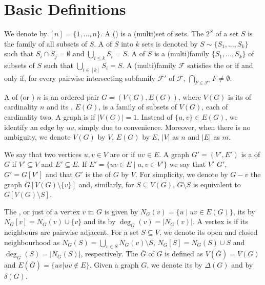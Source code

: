 \section{Basic Definitions}
\label{sec:basic_defs}

We denote by $[n] = \{1, \dots, n\}$.
A () is a (multi)set of sets.
The  $2^S$ of a set $S$ is the family of all subsets of $S$.
A  of $S$ into $k$ sets is denoted by $S \sim \{S_1, \dots, S_k\}$ such that $S_i \cap S_j = \emptyset$ and $\bigcup_{i \leq k} S_i = S$.
A  of $S$ is a (multi)family $\{S_1, \dots, S_k\}$ of subsets of $S$ such that $\bigcup_{i \in [k]} S_i = S$.
A (multi)family $\mathcal{F}$ satisfies the  or  if and only if, for every pairwise intersecting subfamily $\mathcal{F}'$ of $\mathcal{F}$, $\bigcap_{F \in \mathcal{F}'} F \neq \emptyset$.

A  of  (or ) $n$ is an ordered pair $G = (V(G), E(G))$, where $V(G)$ is its  of cardinality $n$ and its , $E(G)$, is a family of subsets of $V(G)$, each of cardinality two. A graph is  if $|V(G)| = 1$.
Instead of $\{u,v\} \in E(G)$, we identify an edge by $uv$, simply due to convenience. Moreover, when there is no ambiguity, we denote $V(G)$ by $V$, $E(G)$ by $E$, $|V|$ as $n$ and $|E|$ as $m$.

We say that two vertices $u,v \in V$ are  or  if $uv \in E$.
A graph $G' = (V', E')$ is a  of $G$ if $V' \subseteq V$ and $E' \subseteq E$.
If $E' = \{uv \in E \mid u,v \in V'\}$ we say that $V'$  $G'$, $G' = G[V']$ and that $G'$ is the  of $G$ by $V$.
For simplicity, we denote by $G - v$ the graph $G[V(G) \setminus \{v\}]$ and, similarly, for $S \subseteq V(G)$, $G \setminus S$ is equivalent to $G[V(G) \setminus S]$.

The , or just  of a vertex $v$ in $G$ is given by $N_G(v) = \{u \mid uv \in E(G)\}$, its  by $N_G[v] = N_G(v) \cup \{v\}$ and its  by $\deg_G(v) = |N_G(v)|$.
A vertex is  if its neighbours are pairwise adjacent.
For a set $S \subseteq V$, we denote its open and closed neighbourhood as $N_G(S) = \bigcup_{v \in S} N_G(v) \setminus S$, $N_G[S] = N_G(S) \cup S$ and $\deg_G(S) = |N_G(S)|$, respectively.
The  $\overline{G}$ of $G$ is defined as $V(\overline{G}) = V(G)$ and $E(\overline{G}) = \{uv | uv \notin E\}$.
Given a graph $G$, we denote its  by $\Delta(G)$ and  by $\delta(G)$.

